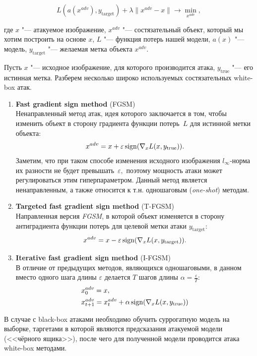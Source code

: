 \documentclass[12pt,a4paper]{article}
\begin{document}
$$
L(a(x^{adv}), y_{\text{target}}) + \lambda \lVert x^{adv} - x \rVert \to \min_{x^{adv}},
$$

где $x$ "--- атакуемое изображение, $x^{adv}$ "--- состязательный объект, который мы хотим построить на основе $x$, $L$ "--- функция потерь нашей модели, $a(x)$ "--- модель, $y_{\text{target}}$ "--- желаемая метка объекта $x^{adv}$.

\par Пусть $x$ "--- исходное изображение, для которого производится атака, $y_{\text{true}}$ "--- его истинная метка. Разберем несколько широко используемых состязательных white-box атак.
\begin{enumerate}
	\item \textbf{Fast gradient sign method} (FGSM)\\
	Ненаправленный метод атак, идея которого заключается в том, чтобы изменить объект в сторону градиента функции потерь~$L$ для истинной метки объекта:
	\[
		x^{adv} = x + \varepsilon \mathop{\rm sign}\limits (\nabla_x L(x, y_{\text{true}})).
	\]
	Заметим, что при таком способе изменения исходного изображения $l_\infty$-норма их разности не будет превышать~$\varepsilon,$ поэтому мощность атаки может регулироваться этим гиперпараметром. Данный метод является ненаправленным, а также относится к т.н. одношаговым (\emph{one-shot}) методам.
	\item \textbf{Targeted fast gradient sign method} (T-FGSM)\\
	Направленная версия \textit{FGSM}, в которой объект изменяется в сторону антиградиента функции потерь для целевой метки атаки $y_{\text{target}}:$
	\[
		x^{adv} = x - \varepsilon \mathop{\rm sign}\limits (\nabla_x L(x, y_{\text{target}})).
	\]
	\item \textbf{Iterative fast gradient sign method} (I-FGSM)\\
	В отличие от предыдущих методов, являющихся одношаговыми, в данном вместо одного шага длины $\varepsilon$ делается $T$ шагов длины $\alpha = \frac{\varepsilon}{T}:$
	\begin{align}
		&x_0^{adv} = x \notag,\\
		&x_{t+1}^{adv} = x_t^{adv} + \alpha \mathop{\rm sign}\limits (\nabla_x L(x, y_{\text{true}})) \notag
	\end{align}
\end{enumerate}


В случае с black-box атаками необходимо обучить суррогатную модель на выборке, таргетами в которой являются предсказания атакуемой модели (<<чёрного ящика>>), после чего для полученной модели проводится атака white-box методами.

\nocite{ribeiro2016should}
\nocite{medium_adversarial}


\end{document}
